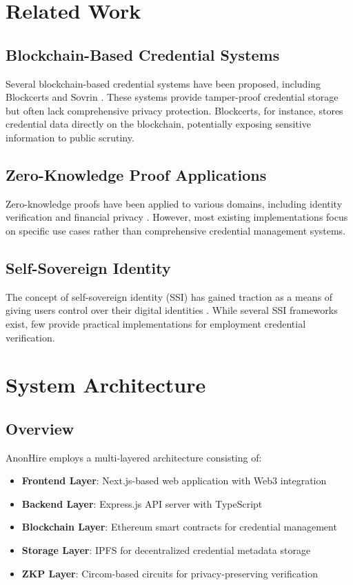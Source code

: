 \documentclass[conference]{IEEEtran}
\begin{document}
\section{Related Work}

\subsection{Blockchain-Based Credential Systems}

Several blockchain-based credential systems have been proposed, including Blockcerts \cite{clark2016blockcerts} and Sovrin \cite{reed2018sovrin}. These systems provide tamper-proof credential storage but often lack comprehensive privacy protection. Blockcerts, for instance, stores credential data directly on the blockchain, potentially exposing sensitive information to public scrutiny.

\subsection{Zero-Knowledge Proof Applications}

Zero-knowledge proofs have been applied to various domains, including identity verification \cite{bensasson2014zerocash} and financial privacy \cite{bensasson2014succinct}. However, most existing implementations focus on specific use cases rather than comprehensive credential management systems.

\subsection{Self-Sovereign Identity}

The concept of self-sovereign identity (SSI) has gained traction as a means of giving users control over their digital identities \cite{allen2016path}. While several SSI frameworks exist, few provide practical implementations for employment credential verification.

\section{System Architecture}

\subsection{Overview}

AnonHire employs a multi-layered architecture consisting of:

\begin{itemize}
\item \textbf{Frontend Layer}: Next.js-based web application with Web3 integration
\item \textbf{Backend Layer}: Express.js API server with TypeScript
\item \textbf{Blockchain Layer}: Ethereum smart contracts for credential management
\item \textbf{Storage Layer}: IPFS for decentralized credential metadata storage
\item \textbf{ZKP Layer}: Circom-based circuits for privacy-preserving verification
\end{itemize}
\end{document}
